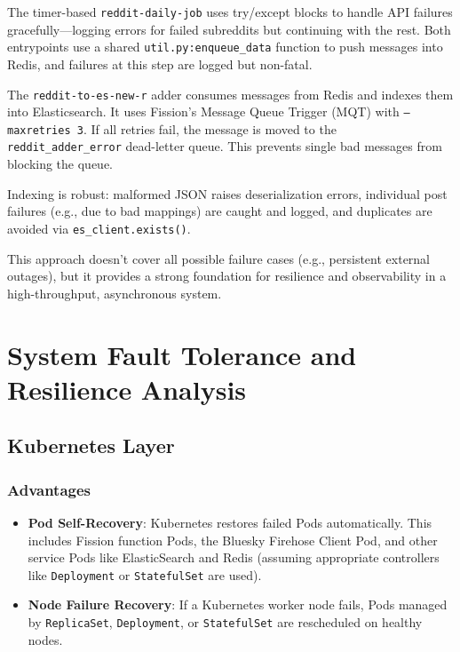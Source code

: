 \documentclass[]{article}
\numberwithin{equation}{section}
\begin{document}
The timer-based \texttt{reddit-daily-job} uses try/except blocks to handle API failures gracefully—logging errors for failed subreddits but continuing with the rest. Both entrypoints use a shared \texttt{util.py:enqueue\_data} function to push messages into Redis, and failures at this step are logged but non-fatal.

The \texttt{reddit-to-es-new-r} adder consumes messages from Redis and indexes them into Elasticsearch. It uses Fission’s Message Queue Trigger (MQT) with \texttt{--maxretries 3}. If all retries fail, the message is moved to the \texttt{reddit\_adder\_error} dead-letter queue. This prevents single bad messages from blocking the queue.

Indexing is robust: malformed JSON raises deserialization errors, individual post failures (e.g., due to bad mappings) are caught and logged, and duplicates are avoided via \texttt{es\_client.exists()}. 

This approach doesn’t cover all possible failure cases (e.g., persistent external outages), but it provides a strong foundation for resilience and observability in a high-throughput, asynchronous system.

\section*{System Fault Tolerance and Resilience Analysis}

\subsection*{Kubernetes Layer}

\subsubsection*{Advantages}
\begin{itemize}
  \item \textbf{Pod Self-Recovery}: Kubernetes restores failed Pods automatically. This includes Fission function Pods, the Bluesky Firehose Client Pod, and other service Pods like ElasticSearch and Redis (assuming appropriate controllers like \texttt{Deployment} or \texttt{StatefulSet} are used).
  \item \textbf{Node Failure Recovery}: If a Kubernetes worker node fails, Pods managed by \texttt{ReplicaSet}, \texttt{Deployment}, or \texttt{StatefulSet} are rescheduled on healthy nodes.
\end{itemize}
\end{document}
